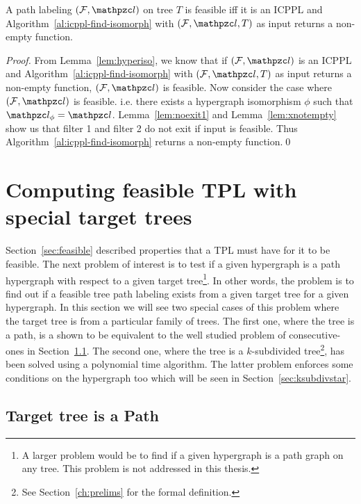 \documentclass[MS]             %
              {iitmdiss_as}    %
\begin{document}
\begin{theorem}
  \label{th:charac}
  A path labeling $(\cF, \cl)$ on tree $T$ is feasible iff it is an
  ICPPL and Algorithm~\ref{al:icppl-find-isomorph} with $(\cF, \cl,
  T)$ as input returns a non-empty function.
\end{theorem}
\begin{proof}
  From Lemma~\ref{lem:hyperiso}, we know that if $(\cF, \cl)$ is an
  ICPPL and Algorithm~\ref{al:icppl-find-isomorph} with $(\cF, \cl,
  T)$ as input returns a non-empty function, $(\cF, \cl)$ is feasible.
  Now consider the case where $(\cF, \cl)$ is feasible. i.e. there
  exists a hypergraph isomorphism $\phi$ such that $\cl_\phi =
  \cl$. Lemma~\ref{lem:noexit1} and Lemma~\ref{lem:xnotempty} show us
  that filter 1 and filter 2 do not exit if input is feasible. Thus
  Algorithm~\ref{al:icppl-find-isomorph} returns a non-empty
  function.\qed
\end{proof}


\section{ Computing feasible TPL with special target trees }
\label{sec:spltargettree}

Section~\ref{sec:feasible} described properties that a TPL must have
for it to be feasible. The next problem of interest is to test if a
given hypergraph is a path hypergraph with respect to a given target
tree\footnote{A larger problem would be to find if a given hypergraph
  is a path graph on any tree. This problem is not addressed in this
  thesis.}. In other words, the problem is to find out if a feasible
tree path labeling exists from a given target tree for a given
hypergraph. In this section we will see two special cases of this
problem where the target tree is from a particular family of
trees. The first one, where the tree is a path, is a shown to be
equivalent to the well studied problem of consecutive-ones in
Section~\ref{sec:icpplicpia}. The second one, where the tree is a
$k$-subdivided tree\footnote{See Section~\ref{ch:prelims} for the
  formal definition.}, has been solved using a polynomial time
algorithm. The latter problem enforces some conditions on the
hypergraph too which will be seen in Section~\ref{sec:ksubdivstar}.

\subsection{Target tree is a Path}
\label{sec:icpplicpia}
\end{document}
